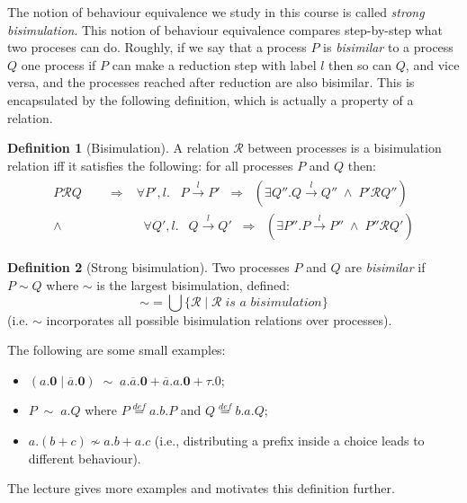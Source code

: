 \documentclass{article}
\theoremstyle{definition}
\newtheorem{definition}{Definition}
\begin{document}
The notion of behaviour equivalence we study in this course is called
\emph{strong bisimulation}. This notion of behaviour equivalence
compares step-by-step what two proceses can do. Roughly, if we say
that a process $P$ is \emph{bisimilar} to a process $Q$ one process if
$P$ can make a reduction step with label $l$ then so can $Q$, and vice
versa, and the processes reached after reduction are also
bisimilar. This is encapsulated by the following definition,
which is actually a property of a relation.

\begin{definition}[Bisimulation]
  A relation $\mathcal{R}$ between processes is a bisimulation
  relation iff it satisfies the following: for all processes
  $P$ and $Q$ then:
  \begin{align*}
    \begin{array}{rl}
P \mathcal{R} Q \qquad \Rightarrow & \forall P', l . \;\;\; P \xrightarrow{l} P' \;\; \Rightarrow \;\;
      (\exists Q'' . Q \xrightarrow{l} Q'' \; \wedge \; P' \mathcal{R}
      Q'') \\
      \wedge & \;\; \forall Q', l . \;\:\; Q \xrightarrow{l} Q'  \;\; \Rightarrow \;\; (\exists P'' . P \xrightarrow{l} P'' \; \wedge \; P'' \mathcal{R} Q')
      \end{array}
  \end{align*}
\end{definition}
%
\begin{definition}[Strong bisimulation]
  Two processes $P$ and $Q$ are \emph{bisimilar} if $P \sim Q$
  where $\sim$ is the largest bisimulation, defined:
  \begin{equation*}
\sim = \bigcup \{\mathcal{R} \mid \mathcal{R} \; \textit{is a bisimulation} \}
  \end{equation*}
  (i.e. $\sim$ incorporates all possible bisimulation relations over processes).
\end{definition}
%
The following are some small examples:
%
\begin{itemize}
\item $(a.\mathbf{0} \mid \overline{a}.\mathbf{0})
\; \sim \; a.\overline{a}.\mathbf{0} + \overline{a}.a.\mathbf{0} +
\tau.0$;
\item $P \; \sim\;  a.Q$ where $P
{\mathrel{\mathop{=}\limits^{{def}}}} a.b.P$
and $Q {\mathrel{\mathop{=}\limits^{{def}}}} b.a.Q$;
\item $a.(b+c) \not\sim a.b + a.c$ (i.e., distributing
a prefix inside a choice leads to different behaviour).
\end{itemize}
%
The lecture gives more examples and motivates this definition further.
\end{document}
